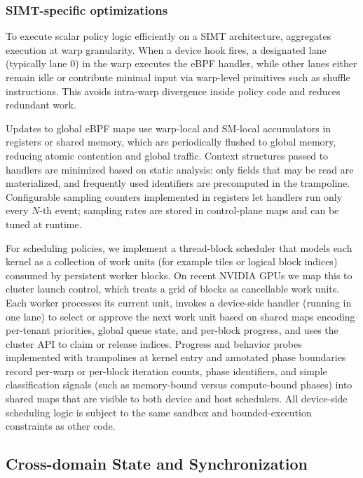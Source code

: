 \subsubsection{SIMT-specific optimizations}

To execute scalar policy logic efficiently on a SIMT architecture, \sys aggregates
execution at warp granularity. When a device hook fires, a designated lane (typically
lane 0) in the warp executes the eBPF handler, while other lanes either remain idle
or contribute minimal input via warp-level primitives such as shuffle instructions.
This avoids intra-warp divergence inside policy code and reduces redundant work.

Updates to global eBPF maps use warp-local and SM-local accumulators in registers
or shared memory, which are periodically flushed to global memory, reducing atomic
contention and global traffic. Context structures passed to handlers are minimized
based on static analysis: only fields that may be read are materialized, and
frequently used identifiers are precomputed in the trampoline. Configurable sampling
counters implemented in registers let handlers run only every \(N\)-th event; sampling
rates are stored in control-plane maps and can be tuned at runtime.

For scheduling policies, we implement a thread-block scheduler that models each
kernel as a collection of work units (for example tiles or logical block indices)
consumed by persistent worker blocks. On recent NVIDIA GPUs we map this to cluster
launch control, which treats a grid of blocks as cancellable work units. Each worker
processes its current unit, invokes a device-side \sys handler (running in one lane)
to select or approve the next work unit based on shared maps encoding per-tenant
priorities, global queue state, and per-block progress, and uses the cluster API to
claim or release indices. Progress and behavior probes implemented with \sys
trampolines at kernel entry and annotated phase boundaries record per-warp or
per-block iteration counts, phase identifiers, and simple classification signals
(such as memory-bound versus compute-bound phases) into shared maps that are
visible to both device and host schedulers. All device-side scheduling logic is
subject to the same sandbox and bounded-execution constraints as other \sys code.

\subsection{Cross-domain State and Synchronization}
\label{sec:impl-state}

